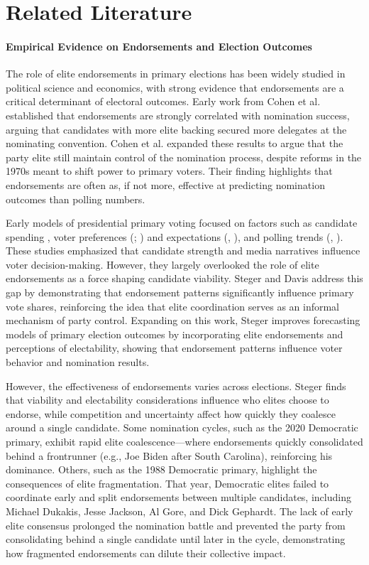 \section{Related Literature}
\paragraph{Empirical Evidence on Endorsements and Election Outcomes}
The role of elite endorsements in primary elections has been widely studied in political science and economics, with strong evidence that endorsements are a critical determinant of electoral outcomes. Early work from Cohen et al. \parencite*{cohen2003} established that endorsements are strongly correlated with nomination success, arguing that candidates with more elite backing secured more delegates at the nominating convention. Cohen et al. \parencite*{Cohen2008} expanded these results to argue that the party elite still maintain control of the nomination process, despite reforms in the 1970s meant to shift power to primary voters. Their finding highlights that endorsements are often as, if not more, effective at predicting nomination outcomes than polling numbers. 

Early models of presidential primary voting focused on factors such as candidate spending \parencite{Goldstein1978}, voter preferences (\cite{Marshall1983}; \cite{Norrander1986}) and expectations (\cite{Bartels1987}, \cite*{Bartels1988}), and polling trends (\cite{Mayer1996}, \cite*{Mayer2003}). These studies emphasized that candidate strength and media narratives influence voter decision-making. However, they largely overlooked the role of elite endorsements as a force shaping candidate viability. Steger and Davis \parencite*{Davis2000} address this gap by demonstrating that endorsement patterns significantly influence primary vote shares, reinforcing the idea that elite coordination serves as an informal mechanism of party control. Expanding on this work, Steger \parencite*{Steger2007} improves forecasting models of primary election outcomes by incorporating elite endorsements and perceptions of electability, showing that endorsement patterns influence voter behavior and nomination results.

However, the effectiveness of endorsements varies across elections. Steger \parencite*{Steger2008} finds that viability and electability considerations influence who elites choose to endorse, while competition and uncertainty affect how quickly they coalesce around a single candidate. Some nomination cycles, such as the 2020 Democratic primary, exhibit rapid elite coalescence—where endorsements quickly consolidated behind a frontrunner (e.g., Joe Biden after South Carolina), reinforcing his dominance. Others, such as the 1988 Democratic primary, highlight the consequences of elite fragmentation. That year, Democratic elites failed to coordinate early and split endorsements between multiple candidates, including Michael Dukakis, Jesse Jackson, Al Gore, and Dick Gephardt. The lack of early elite consensus prolonged the nomination battle and prevented the party from consolidating behind a single candidate until later in the cycle, demonstrating how fragmented endorsements can dilute their collective impact.

